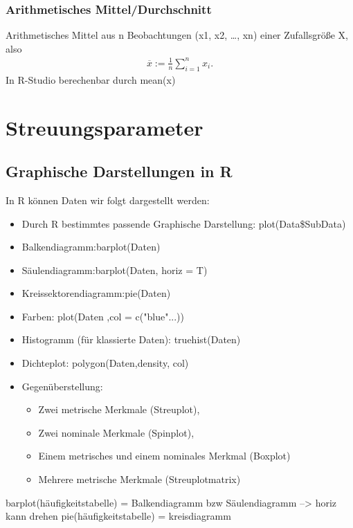 \documentclass[a4paper,10pt]{scrartcl}
\begin{document}
\subsubsection{Arithmetisches Mittel/Durchschnitt}
Arithmetisches Mittel aus n Beobachtungen (x1, x2, …, xn) einer Zufallsgröße X, also 
\begin{eqnarray*}\overline{x}:=\frac{1}{n}\displaystyle \sum _{i=1}^{n}{x}_{i}.\end{eqnarray*}
In R-Studio berechenbar durch mean(x)
\newpage
\section{Streuungsparameter}
\subsection{Graphische Darstellungen in R}
In R können Daten wir folgt dargestellt werden:
\begin{itemize}
    \item Durch R bestimmtes passende Graphische Darstellung: plot(Data\$SubData)
    \item Balkendiagramm:barplot(Daten)
    \item Säulendiagramm:barplot(Daten, horiz = T)
    \item Kreissektorendiagramm:pie(Daten)
    \item Farben: plot(Daten ,col = c("blue"...))
    \item Histogramm (für klassierte Daten): truehist(Daten)
    \item Dichteplot: polygon(Daten,density, col)
    \item Gegenüberstellung:
    \begin{itemize}
        \item Zwei metrische Merkmale (Streuplot), 
        \item Zwei nominale Merkmale (Spinplot), 
        \item Einem metrisches und einem nominales Merkmal (Boxplot)
        \item Mehrere metrische Merkmale (Streuplotmatrix)
    \end{itemize}
\end{itemize}
barplot(häufigkeitstabelle) = Balkendiagramm bzw Säulendiagramm --> horiz kann drehen
pie(häufigkeitstabelle) = kreisdiagramm
\end{document}
